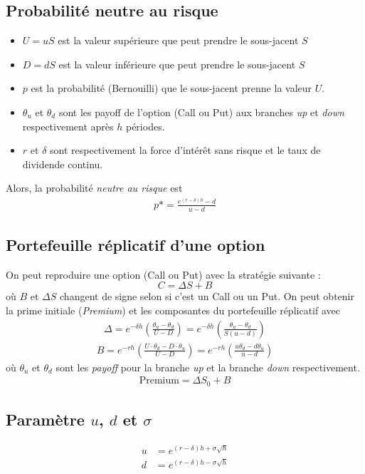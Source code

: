 \documentclass[10pt, french]{article}
\begin{document}
\begin{multicols*}{2}
\subsection*{Probabilité neutre au risque}
\begin{itemize}
\item $U = uS$ est la valeur supérieure que peut prendre le sous-jacent $S$
\item $D = dS$ est la valeur inférieure que peut prendre le sous-jacent $S$
\item $p$ est la probabilité (Bernouilli) que le sous-jacent prenne la valeur $U$.
\item $\theta_u$ et $\theta_d$ sont les payoff de l'option (Call ou Put) aux branches \emph{up} et \emph{down} respectivement après $h$ périodes.
\item $r$ et $\delta$ sont respectivement la force d'intérêt sans risque et le taux de dividende continu.
\end{itemize}
 Alors, la probabilité \textit{neutre au risque} est
\begin{align*}
p* = \frac{e^{(r-\delta)h} - d}{u-d}
\end{align*}

\subsection*{Portefeuille réplicatif d'une option}
On peut reproduire une option (Call ou Put) avec la stratégie suivante  :
\[C = \Delta S + B\]
où $B$ et $\Delta S$ changent de signe selon si c'est un Call ou un Put. On peut obtenir la prime initiale (\textit{Premium}) et les composantes du portefeuille réplicatif avec
\begin{align*}
\Delta = e^{-\delta h} \left( \frac{\theta_u - \theta_d}{U - D} \right) =   e^{-\delta h} \left( \frac{\theta_u - \theta_d}{S(u -d)} \right)
\end{align*}
\begin{align*}
B = e^{-rh} \left( \frac{U \cdot \theta_d - D \cdot \theta_u}{U - D} \right) = e^{-rh} \left( \frac{u \theta_d - d \theta_u}{u-d} \right)
\end{align*}
où $\theta_u$ et $\theta_d$ sont les \emph{payoff} pour la branche \emph{up} et la branche \emph{down} respectivement.
\begin{align*}
\text{Premium} = \Delta S_0 + B
\end{align*}


\subsection*{Paramètre $u$, $d$ et $\sigma$}
\begin{align*}
	u & = e^{(r-\delta)h + \sigma \sqrt{h}} \\
	d & = e^{(r-\delta)h - \sigma \sqrt{h}} \\
\end{align*}


\end{multicols*}
\end{document}
